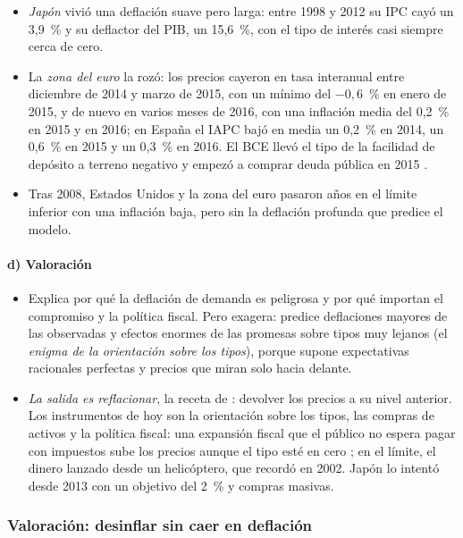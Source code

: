 \documentclass[11pt]{article}
\begin{document}
\begin{itemize}
\item \emph{Japón} vivió una deflación suave pero larga: entre 1998 y 2012 su IPC cayó un 3,9~\% y su deflactor del PIB, un 15,6~\%, con el tipo de interés casi siempre cerca de cero\nocite{BM2026IPCJapon}.
\item La \emph{zona del euro} la rozó: los precios cayeron en tasa interanual entre diciembre de 2014 y marzo de 2015, con un mínimo del $-0{,}6$~\% en enero de 2015, y de nuevo en varios meses de 2016, con una inflación media del 0,2~\% en 2015 y en 2016; en España el IAPC bajó en media un 0,2~\% en 2014, un 0,6~\% en 2015 y un 0,3~\% en 2016\nocite{Eurostat2026IAPC}. El BCE llevó el tipo de la facilidad de depósito a terreno negativo y empezó a comprar deuda pública en 2015 .
\item Tras 2008, Estados Unidos y la zona del euro pasaron años en el límite inferior con una inflación baja, pero sin la deflación profunda que predice el modelo.
\end{itemize}

\paragraph{d) Valoración}

\begin{itemize}
\item Explica por qué la deflación de demanda es peligrosa y por qué importan el compromiso y la política fiscal. Pero exagera: predice deflaciones mayores de las observadas y efectos enormes de las promesas sobre tipos muy lejanos (el \emph{enigma de la orientación sobre los tipos}), porque supone expectativas racionales perfectas y precios que miran solo hacia delante.
\item \emph{La salida es reflacionar}, la receta de : devolver los precios a su nivel anterior. Los instrumentos de hoy son la orientación sobre los tipos, las compras de activos  y la política fiscal: una expansión fiscal que el público no espera pagar con impuestos sube los precios aunque el tipo esté en cero\nocite{Sims2016Fiscal} ; en el límite, el dinero lanzado desde un helicóptero, que  recordó en 2002\nocite{Bernanke2002Deflation}. Japón lo intentó desde 2013 con un objetivo del 2~\% y compras masivas\nocite{BoJ2013QQE}.
\end{itemize}

\subsubsection{Valoración: desinflar sin caer en deflación}\label{sec:desinflacion}
\end{document}
